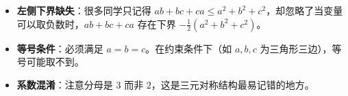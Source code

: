 \begin{trapbox}
\begin{itemize}
    \item \textbf{左侧下界缺失}：很多同学只记得 $ab+bc+ca \leqslant a^2+b^2+c^2$，却忽略了当变量可以取负数时，$ab+bc+ca$ 存在下界 $-\frac{1}{2}(a^2+b^2+c^2)$。
    \item \textbf{等号条件}：必须满足 $a=b=c$。在约束条件下（如 $a,b,c$ 为三角形三边），等号可能取不到。
    \item \textbf{系数混淆}：注意分母是 $3$ 而非 $2$，这是三元对称结构最易记错的地方。
\end{itemize}
\end{trapbox}